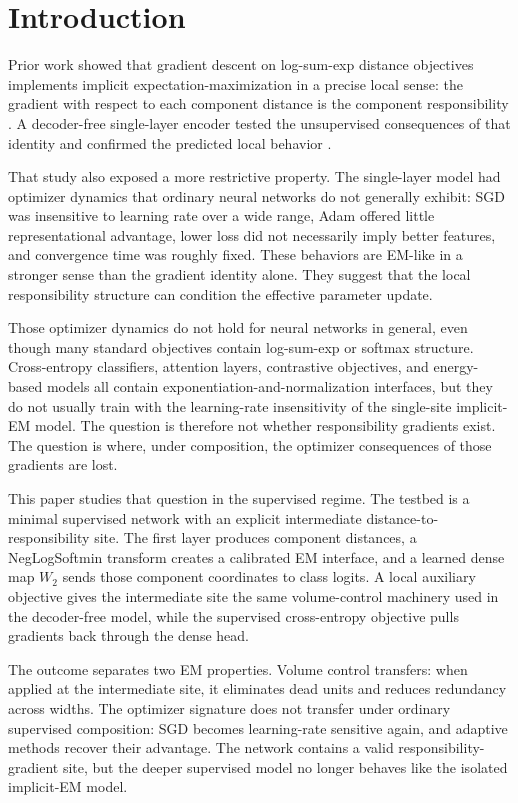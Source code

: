 \section{Introduction}
\label{sec:introduction}

Prior work showed that gradient descent on log-sum-exp distance objectives
implements implicit expectation-maximization in a precise local sense: the
gradient with respect to each component distance is the component
responsibility \citep{oursland2025implicitem}. A decoder-free single-layer
encoder tested the unsupervised consequences of that identity and confirmed
the predicted local behavior \citep{oursland2026decoderfree}.

That study also exposed a more restrictive property. The single-layer model
had optimizer dynamics that ordinary neural networks do not generally exhibit:
SGD was insensitive to learning rate over a wide range, Adam offered little
representational advantage, lower loss did not necessarily imply better
features, and convergence time was roughly fixed. These behaviors are
EM-like in a stronger sense than the gradient identity alone. They suggest
that the local responsibility structure can condition the effective parameter
update.

Those optimizer dynamics do not hold for neural networks in general, even
though many standard objectives contain log-sum-exp or softmax structure.
Cross-entropy classifiers, attention layers, contrastive objectives, and
energy-based models all contain exponentiation-and-normalization interfaces,
but they do not usually train with the learning-rate insensitivity of the
single-site implicit-EM model. The question is therefore not whether
responsibility gradients exist. The question is where, under composition, the
optimizer consequences of those gradients are lost.

This paper studies that question in the supervised regime. The testbed is a
minimal supervised network with an explicit intermediate
distance-to-responsibility site. The first layer produces component distances,
a NegLogSoftmin transform creates a calibrated EM interface, and a learned
dense map $W_2$ sends those component coordinates to class logits. A local
auxiliary objective gives the intermediate site the same volume-control
machinery used in the decoder-free model, while the supervised
cross-entropy objective pulls gradients back through the dense head.

The outcome separates two EM properties. Volume control transfers: when
applied at the intermediate site, it eliminates dead units and reduces
redundancy across widths. The optimizer signature does not transfer under
ordinary supervised composition: SGD becomes learning-rate sensitive again,
and adaptive methods recover their advantage. The network contains a valid
responsibility-gradient site, but the deeper supervised model no longer
behaves like the isolated implicit-EM model.

